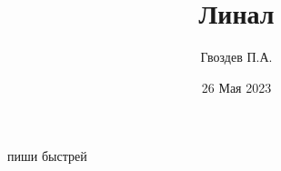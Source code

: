 ﻿\documentclass{article}
\author{Гвоздев П.А.}
\title{Линал}
\date{26 Мая 2023}
\begin{document}
    \maketitle
    пиши быстрей
\end{document}
